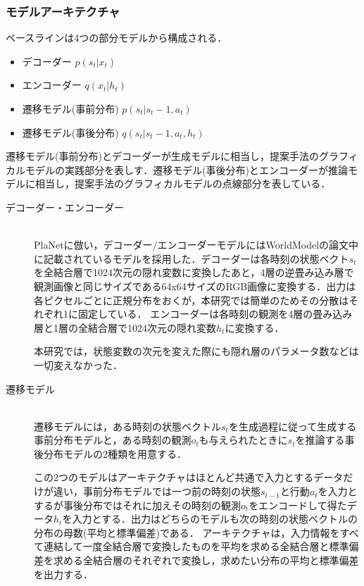 \subsubsection{モデルアーキテクチャ}
ベースラインは4つの部分モデルから構成される．
\begin{itemize}
    \item デコーダー $p(s_t|x_t)$
    \item エンコーダー $q(x_t|h_t)$
    \item 遷移モデル(事前分布) $p(s_t|s_t-1, a_t)$
    \item 遷移モデル(事後分布) $q(s_t|s_t-1, a_t, h_t)$
\end{itemize}

遷移モデル(事前分布)とデコーダーが生成モデルに相当し，提案手法のグラフィカルモデルの実践部分を表しす．遷移モデル(事後分布)とエンコーダーが推論モデルに相当し，提案手法のグラフィカルモデルの点線部分を表している．

\begin{description}
    \item[デコーダー・エンコーダー]\mbox{}\\
PlaNetに倣い，デコーダー/エンコーダーモデルにはWorldModel\cite{ha1803world}の論文中に記載されているモデルを採用した．デコーダーは各時刻の状態ベクト$s_t$を全結合層で1024次元の隠れ変数に変換したあと，4層の逆畳み込み層で観測画像と同じサイズである64x64サイズのRGB画像に変換する．出力は各ピクセルごとに正規分布をおくが，本研究では簡単のためその分散はそれぞれ1に固定している．
エンコーダーは各時刻の観測を4層の畳み込み層と1層の全結合層で1024次元の隠れ変数$h_t$に変換する．

本研究では，状態変数の次元を変えた際にも隠れ層のパラメータ数などは一切変えなかった．

    \item[遷移モデル]\mbox{}\\
遷移モデルには，ある時刻の状態ベクトル$s_t$を生成過程に従って生成する事前分布モデルと，ある時刻の観測$o_t$も与えられたときに$s_t$を推論する事後分布モデルの2種類を用意する．

この2つのモデルはアーキテクチャはほとんど共通で入力とするデータだけが違い，事前分布モデルでは一つ前の時刻の状態$s_{t-1}$と行動$a_t$を入力とするが事後分布ではそれに加えその時刻の観測$o_t$をエンコードして得たデータ$h_t$を入力とする．出力はどちらのモデルも次の時刻の状態ベクトルの分布の母数(平均と標準偏差)である．
アーキテクチャは，入力情報をすべて連結して一度全結合層で変換したものを平均を求める全結合層と標準偏差を求める全結合層のそれぞれで変換し，求めたい分布の平均と標準偏差を出力する．

\end{description}

